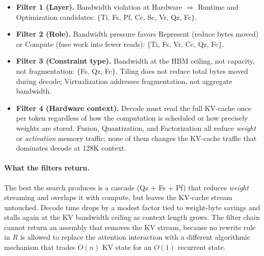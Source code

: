 \documentclass[10pt,twocolumn]{article}
\begin{document}
\begin{itemize}[nosep, leftmargin=*]
\item \textbf{Filter 1 (Layer).} Bandwidth violation at Hardware $\Rightarrow$ Runtime and Optimization candidates: $\{$Ti, Fs, Pf, Cc, Sc, Vr, Qz, Fc$\}$.
\item \textbf{Filter 2 (Role).} Bandwidth pressure favors Represent (reduce bytes moved) or Compute (fuse work into fewer reads): $\{$Ti, Fs, Vr, Cc, Qz, Fc$\}$.
\item \textbf{Filter 3 (Constraint type).} Bandwidth at the HBM ceiling, not capacity, not fragmentation: $\{$Fs, Qz, Fc$\}$. Tiling does not reduce total bytes moved during decode; Virtualization addresses fragmentation, not aggregate bandwidth.
\item \textbf{Filter 4 (Hardware context).} Decode must read the full KV-cache once per token regardless of how the computation is scheduled or how precisely weights are stored. Fusion, Quantization, and Factorization all reduce \emph{weight} or \emph{activation} memory traffic; none of them changes the KV-cache traffic that dominates decode at 128K context.
\end{itemize}

\paragraph{What the filters return.} The best the search produces is a cascade (Qz + Fs + Pf) that reduces \emph{weight} streaming and overlaps it with compute, but leaves the KV-cache stream untouched. Decode time drops by a modest factor tied to weight-byte savings and stalls again at the KV bandwidth ceiling as context length grows. The filter chain cannot return an assembly that removes the KV stream, because no rewrite rule in $R$ is allowed to replace the attention interaction with a different algorithmic mechanism that trades $O(n)$ KV state for an $O(1)$ recurrent state.
\end{document}
